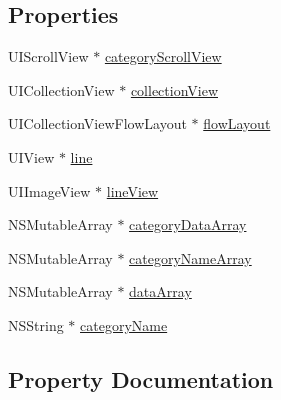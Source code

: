 \subsection*{Properties}
\begin{DoxyCompactItemize}
\item 
U\+I\+Scroll\+View $\ast$ \mbox{\hyperlink{category_category_view_controller_07_08_a218430354eda29b21da53a6651215454}{category\+Scroll\+View}}
\item 
U\+I\+Collection\+View $\ast$ \mbox{\hyperlink{category_category_view_controller_07_08_ae03b7fcd4247bf24a393b26a7bec8b08}{collection\+View}}
\item 
U\+I\+Collection\+View\+Flow\+Layout $\ast$ \mbox{\hyperlink{category_category_view_controller_07_08_a87793fa01f4794bc16623ef6082bb489}{flow\+Layout}}
\item 
U\+I\+View $\ast$ \mbox{\hyperlink{category_category_view_controller_07_08_aa0772e964394250fed43e07578f03d7f}{line}}
\item 
U\+I\+Image\+View $\ast$ \mbox{\hyperlink{category_category_view_controller_07_08_a66db89f4663079a056733e12e6025875}{line\+View}}
\item 
N\+S\+Mutable\+Array $\ast$ \mbox{\hyperlink{category_category_view_controller_07_08_a6ffac0bede4c79fd73ffab627f9314c7}{category\+Data\+Array}}
\item 
N\+S\+Mutable\+Array $\ast$ \mbox{\hyperlink{category_category_view_controller_07_08_abf6070cdb2ff9d1c712edd91d4c62e93}{category\+Name\+Array}}
\item 
N\+S\+Mutable\+Array $\ast$ \mbox{\hyperlink{category_category_view_controller_07_08_af691264994e7c9d3bf14cef1e21ccda7}{data\+Array}}
\item 
N\+S\+String $\ast$ \mbox{\hyperlink{category_category_view_controller_07_08_a9883e317e4e1918da7fb942572a653ce}{category\+Name}}
\end{DoxyCompactItemize}


\subsection{Property Documentation}
\mbox{\label{category_category_view_controller_07_08_a6ffac0bede4c79fd73ffab627f9314c7}} 
